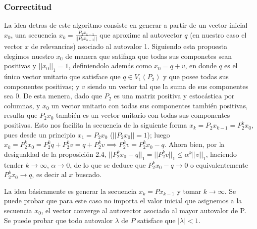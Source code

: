 \iffalse
  Como ya hemos visto por las proposiciones anteriores, dado que $P_2$ es una matriz positiva y estocástica por columnas, la $dim(V_1(P_2))$ es 1 y su autovector asociado posee todas sus componentes de igual signo.   

\textbf{LO SIGUIENTE ES PARA MAURO. HACELO EN TE RO (SI ENTERO), NO SEAS PAJERO. QUIERO LA SECCION BIEN COMPLETA CON LOS PUNTOS OPCIONALES, SOLO TENES QUE HACER ESTO. IMAGINATE QUE YO ME MORFE ESCRIBIR TODO.}

La pregunta mas importante del trabajo, dado la matriz de transiciones $P$ que garantiza la existencia y unicidad del autovector de norma 1 asociado al autovalor 1, como lo computamos?
\fi

\subsubsection{Correctitud}


La idea detras de este algoritmo consiste en generar a partir de un vector inicial $x_0$, una secuencia $x_k = \frac{P_2x_{k-1}}{||P_2x_{k-1}||}$ que aproxime al autovector $q$ (en nuestro caso el vector $x$ de relevancias) asociado al autovalor 1. Siguiendo esta propuesta elegimos nuestro $x_0$ de manera que satifaga que todas sus componetes sean positivas y $||x_0||_1 = 1$, definiendolo además como $x_0 = q + v$, en donde $q$ es el único vector unitario que satisface que $q \in V_1(P_2)$ y que posee todas sus componentes positivas; y $v$ siendo un vector tal que la suma de sus componentes sea 0. De esta menera, dado que $P_2$ es una matriz positiva y estocástica por columnas, y $x_0$ un vector unitario con todas sus componentes también positivas, resulta que $P_2x_0$ también es un vector unitario con todas sus componentes positivas. Esto nos facilita la secuencia de la siguiente forma $x_k = P_2x_{k-1} = P_2^kx_0$, pues desde un principio $x_1 = P_2x_0$ ($||P_2x_0||=1$); luego $x_k = P_2^kx_0 = P_2^kq + P_2^kv = q + P_2^kv \implies P_2^kv = P_2^kx_0 - q$. Ahora bien, por la desigualdad de la proposición 2.4, $||P_2^kx_0 - q||_1 = ||P_2^kv||_1 \leq \alpha^k||v||_1$, haciendo tender $k\to\infty$, $\alpha\to 0$, de lo que se deduce que $P_2^kx_0 - q\to 0$ o equivalentemente $P_2^kx_0 \to q$, es decir al $x$ buscado. 

\iffalse
La idea básicamente es generar la secuencia $x_k = Px_{k-1}$ y tomar $k\to\infty$. Se puede probar que para este caso no importa el valor inicial que asignemos a la secuencia $x_0$, el vector converge al autovector asociado al mayor autovalor de P. Se puede probar que todo autovalor $\lambda$ de $P$ satisface que $|\lambda| < 1$.

